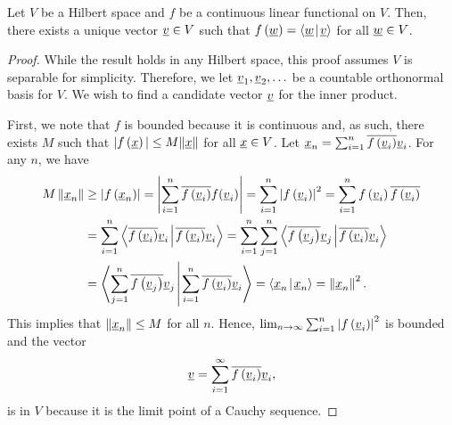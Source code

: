 \begin{theorem}[Riesz] \label{theorem:FunctionalInnerProduct}
Let $V$ be a Hilbert space and $f$ be a continuous linear functional on $V$.
Then, there exists a unique vector $\underline{v} \in V$ such that $f \left( \underline{w} \right) = {\left\langle  \underline{w}  \mskip2mu \middle| \mskip2mu  \underline{v}  \right\rangle}$ for all $\underline{w} \in V$.
\end{theorem}
\begin{proof}
While the result holds in any Hilbert space, this proof assumes $V$ is separable for simplicity.
Therefore, we let $\underline{v}_1, \underline{v}_2, \ldots$ be a countable orthonormal basis for $V$.
We wish to find a candidate vector $\underline{v}$ for the inner product.

First, we note that $f$ is bounded because it is continuous and, as such, there exists $M$ such that $| f \left( \underline{x} \right) | \leq M \| \underline{x} \|$ for all $\underline{x} \in V$.
Let $\underline{x}_n = \sum_{i=1}^n \overline{ f \left( \underline{v}_i \right) } \underline{v}_i$.
For any $n$, we have
\begin{equation*}
\begin{split}
M \left\| \underline{x}_n \right\| &\geq \left| f \left( \underline{x}_n \right) \right|
= \left| \sum_{i=1}^n \overline{ f \left( \underline{v}_i \right) } f(\underline{v}_i) \right|
= \sum_{i=1}^n \left| f \left( \underline{v}_i \right) \right|^2
= \sum_{i=1}^n f \left( \underline{v}_i \right)
\overline{ f \left( \underline{v}_i \right) } \\
&= \sum_{i=1}^n {\left\langle  \overline{ f \left( \underline{v}_i \right) } \underline{v}_i  \mskip2mu \middle| \mskip2mu  \overline{ f \left( \underline{v}_i \right) } \underline{v}_i  \right\rangle}
= \sum_{i=1}^n \sum_{j=1}^n
{\left\langle  \overline{ f \left( \underline{v}_j \right) } \underline{v}_j  \mskip2mu \middle| \mskip2mu  \overline{ f \left( \underline{v}_i \right) } \underline{v}_i  \right\rangle} \\
&= {\left\langle  \sum_{j=1}^n \overline{ f \left( \underline{v}_j \right) } \underline{v}_j  \mskip2mu \middle| \mskip2mu  \sum_{i=1}^n \overline{ f \left( \underline{v}_i \right) } \underline{v}_i  \right\rangle}
= {\left\langle  \underline{x}_n  \mskip2mu \middle| \mskip2mu  \underline{x}_n  \right\rangle}
= \left\| \underline{x}_n \right\|^2 .
\end{split}
\end{equation*}
This implies that $\| \underline{x}_n \| \leq M$ for all $n$.
Hence, $\lim_{n \rightarrow \infty} \sum_{i=1}^n \left| f \left( \underline{v}_i \right) \right|^2$ is bounded and the vector
\begin{equation*}
\underline{v} = \sum_{i=1}^{\infty} \overline{ f \left( \underline{v}_i \right) } \underline{v}_i ,
\end{equation*}
is in $V$ because it is the limit point of a Cauchy sequence.

\end{proof}
